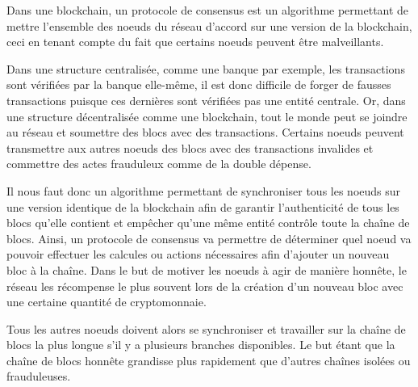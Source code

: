 Dans une blockchain, un protocole de consensus est un algorithme permettant de mettre l'ensemble des noeuds du réseau d'accord sur une version de la blockchain, ceci en tenant compte du fait que certains noeuds peuvent être malveillants.

Dans une structure centralisée, comme une banque par exemple, les transactions sont vérifiées par la banque elle-même, il est donc difficile de forger de fausses transactions puisque ces dernières sont vérifiées pas une entité centrale. Or, dans une structure décentralisée comme une blockchain, tout le monde peut se joindre au réseau et soumettre des blocs avec des transactions. Certains noeuds peuvent transmettre aux autres noeuds des blocs avec des transactions invalides et commettre des actes frauduleux comme de la double dépense.

Il nous faut donc un algorithme permettant de synchroniser tous les noeuds sur une version identique de la blockchain afin de garantir l'authenticité de tous les blocs qu'elle contient et empêcher qu'une même entité contrôle toute la chaîne de blocs. Ainsi, un protocole de consensus va permettre de déterminer quel noeud va pouvoir effectuer les calcules ou actions nécessaires afin d'ajouter un nouveau bloc à la chaîne. Dans le but de motiver les noeuds à agir de manière honnête, le réseau les récompense le plus souvent lors de la création d'un nouveau bloc avec une certaine quantité de cryptomonnaie. 

Tous les autres noeuds doivent alors se synchroniser et travailler sur la chaîne de blocs la plus longue s'il y a plusieurs branches disponibles. Le but étant que la chaîne de blocs honnête grandisse plus rapidement que d'autres chaînes isolées ou frauduleuses.
